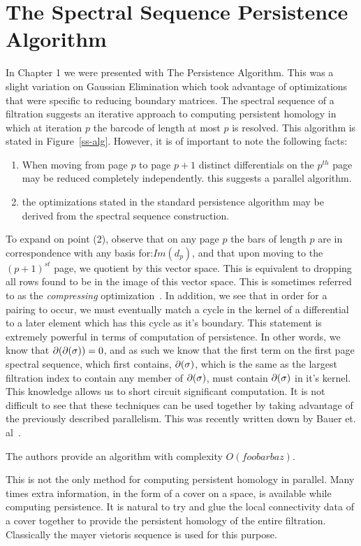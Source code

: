 \section{The Spectral Sequence Persistence Algorithm}
In Chapter 1 we were presented with The Persistence Algorithm. This was a slight variation on Gaussian Elimination which took advantage of optimizations that were specific to reducing boundary matrices. The spectral sequence of a filtration suggests an iterative approach to computing persistent homology in which at iteration $p$ the barcode of length at most $p$ is resolved. This algorithm is stated in Figure~\ref{ss-alg}. However, it is of important to note the following facts:
\begin{enumerate}
\item When moving from page $p$ to page $p+1$ distinct differentials on the $p^{th}$ page may be reduced completely independently. this suggests a parallel algorithm.
\item the optimizations stated in the standard persistence algorithm may be derived from the spectral sequence construction.
\end{enumerate}
To expand on point (2), observe that on any page $p$ the bars of length $p$ are in correspondence with any basis for:$Im(d_p)$, and that upon moving to the $(p+1)^{st}$ page, we quotient by this vector space. This is equivalent to dropping all rows found to be in the image of this vector space. This is sometimes referred to as the \emph{compressing} optimization~\cite{cz}. In addition, we see that in order for a pairing to occur, we must eventually match a cycle in the kernel of a differential to a later element which has this cycle as it's boundary. This statement is extremely powerful in terms of computation of persistence. In other words, we know that $\partial(\partial(\sigma)) = 0$, and as such we know that the first term on the first page spectral sequence, which first contains, $\partial(\sigma)$, which is the same as the largest filtration index to contain any member of $\partial(\sigma)$, must contain $\partial(\sigma)$ in it's kernel. This knowledge allows us to short circuit significant computation. It is not difficult to see that these techniques can be used together by taking advantage of the previously described parallelism. This was recently written down by Bauer et. al~\cite{clear_n_compress}.

The authors provide an algorithm with complexity $O(foobarbaz)$. 

This is not the only method for computing persistent homology in parallel. Many times extra information, in the form of a cover on a space, is available while computing persistence. It is natural to try and glue the local connectivity data of a cover together to provide the persistent homology of the entire filtration. Classically the mayer vietoris sequence is used for this purpose.
  